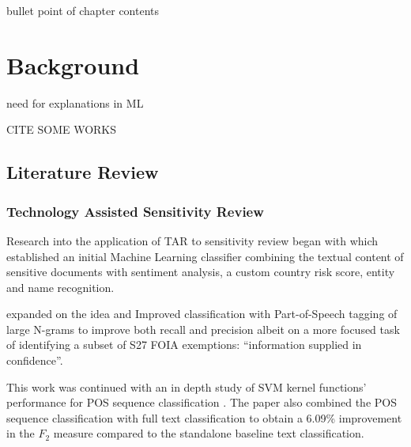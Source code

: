 \documentclass{l4proj}
\begin{document}
bullet point of chapter contents


\chapter{Background}

need for explanations in ML

CITE SOME WORKS

\section{Literature Review}

\subsection{Technology Assisted Sensitivity Review}


Research into the application of TAR to sensitivity review began with \textcite{de_rijke_towards_2014} which established an initial Machine Learning classifier combining the textual content of sensitive documents with sentiment analysis, a custom country risk score, entity and name recognition.

\autocite{sanchezDetectingSensitiveInformation2012}

\textcite{mcdonaldUsingPartofSpeechNgrams2015} expanded on the idea and Improved classification with Part-of-Speech tagging of large N-grams to improve both recall and precision albeit on a more focused task of identifying a subset of S27 FOIA exemptions: ``information supplied in confidence''.

This work was continued with an in depth study of SVM kernel functions' performance for POS sequence classification \autocite{mcdonaldStudySVMKernel2017}.
The paper also combined the POS sequence classification with full text classification to obtain a 6.09\% improvement in the $F_{2}$ measure compared to the standalone baseline text classification.
\end{document}
